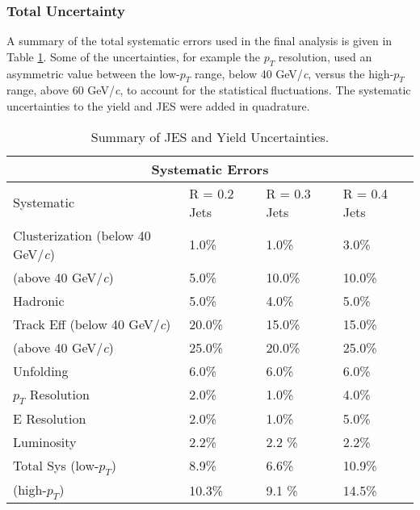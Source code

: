 \subsubsection{Total Uncertainty}

A summary of the total systematic errors used in the final analysis is given in Table \ref{table:1}.  Some of the uncertainties, for example the $p_{T}$ resolution, used an asymmetric value between the low-$p_{T}$ range, below 40 GeV/\textit{c}, versus the high-$p_{T}$ range, above 60 GeV/\textit{c}, to account for the statistical fluctuations.  The systematic uncertainties to the yield and JES were added in quadrature.
\newline

\begin{table}[h!]
\centering
\caption{Summary of JES and Yield Uncertainties.}
\begin{tabular}{ |p{5cm}||p{3cm}|p{3cm}|p{3cm}|  }
 \hline
 \multicolumn{4}{|c|}{Systematic Errors} \\
 \hline
 Systematic &R = 0.2 Jets & R = 0.3 Jets& R = 0.4 Jets\\
 \hline
Clusterization (below 40 GeV/\textit{c}) & 1.0\%    &1.0\%&  3.0\%\\
 (above 40 GeV/\textit{c})           &  5.0\%  & 10.0\%   &  10.0\%\\
Hadronic &   5.0\% & 4.0\% & 5.0\%\\
Track Eff (below 40 GeV/\textit{c})&20.0\% & 15.0\% & 15.0\%\\
 (above 40 GeV/\textit{c})            &  25.0\%  & 20.0\%   &  25.0\%\\
Unfolding & 6.0\% & 6.0\%&  6.0\%\\
$p_{T}$ Resolution & 2.0\% & 1.0\% & 4.0\%\\
E Resolution& 2.0\%   &1.0\% & 5.0\%\\
Luminosity & 2.2\%  & 2.2 \% & 2.2\%\\
 \hline
 \hline
Total Sys (low-$p_{T}$) & 8.9\%  & 6.6\% & 10.9\%\\
(high-$p_{T}$) & 10.3\%  & 9.1 \% & 14.5\%\\
\hline
\end{tabular}

\label{table:1}
\end{table}


